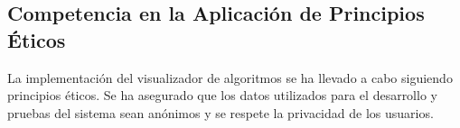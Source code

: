 \subsection{Competencia en la Aplicación de Principios Éticos}
La implementación del visualizador de algoritmos se ha llevado a cabo siguiendo principios éticos. Se ha asegurado que los datos utilizados para el desarrollo y pruebas del sistema sean anónimos y se respete la privacidad de los usuarios.
